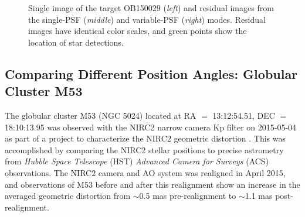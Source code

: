\documentclass[]{spie}  %
\begin{document}
\begin{figure}[!h]
 \caption{\footnotesize Single image of the target OB150029 (\textit{left}) and residual images from the single-PSF (\textit{middle}) and variable-PSF (\textit{right}) modes. Residual images have identical color scales, and green points show the location of star detections.} \label{fig:ob150029-targ-res}
\end{figure}


\subsection{Comparing Different Position Angles: Globular Cluster M53} \label{sec:m53-data}
The globular cluster M53 (NGC 5024) located at RA $=$ 13:12:54.51, DEC $=$ 18:10:13.95 was observed with the NIRC2 narrow camera Kp filter on 2015-05-04 as part of a project to characterize the NIRC2 geometric distortion \cite{service:2016a}. This was accomplished by comparing the NIRC2 stellar positions to precise astrometry from \textit{Hubble Space Telescope} (HST) \textit{Advanced Camera for Surveys} (ACS) observations. The NIRC2 camera and AO system was realigned in April 2015, and observations of M53 before and after this realignment show an increase in the averaged geometric distortion from $\sim$0.5 mas pre-realignment to $\sim$1.1 mas post-realignment.
\end{document}
